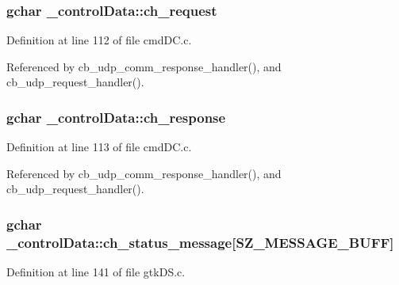 \subsubsection[{\texorpdfstring{ch\+\_\+request}{ch_request}}]{\setlength{\rightskip}{0pt plus 5cm}gchar \+\_\+control\+Data\+::ch\+\_\+request}\hypertarget{struct__control_data_a948c37bbe26f5bdd4841b65384155edf}{}\label{struct__control_data_a948c37bbe26f5bdd4841b65384155edf}


Definition at line 112 of file cmd\+D\+C.\+c.



Referenced by cb\+\_\+udp\+\_\+comm\+\_\+response\+\_\+handler(), and cb\+\_\+udp\+\_\+request\+\_\+handler().

\subsubsection[{\texorpdfstring{ch\+\_\+response}{ch_response}}]{\setlength{\rightskip}{0pt plus 5cm}gchar \+\_\+control\+Data\+::ch\+\_\+response}\hypertarget{struct__control_data_a9423e8582b05e2dde58b7302bee5559b}{}\label{struct__control_data_a9423e8582b05e2dde58b7302bee5559b}


Definition at line 113 of file cmd\+D\+C.\+c.



Referenced by cb\+\_\+udp\+\_\+comm\+\_\+response\+\_\+handler(), and cb\+\_\+udp\+\_\+request\+\_\+handler().

\subsubsection[{\texorpdfstring{ch\+\_\+status\+\_\+message}{ch_status_message}}]{\setlength{\rightskip}{0pt plus 5cm}gchar \+\_\+control\+Data\+::ch\+\_\+status\+\_\+message\mbox{[}{\bf S\+Z\+\_\+\+M\+E\+S\+S\+A\+G\+E\+\_\+\+B\+U\+FF}\mbox{]}}\hypertarget{struct__control_data_aa6d5e703090d185edd3e0b5224542ce5}{}\label{struct__control_data_aa6d5e703090d185edd3e0b5224542ce5}


Definition at line 141 of file gtk\+D\+S.\+c.

